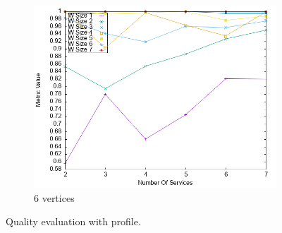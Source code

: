 \begin{figure}[ht]
\begin{subfigure}{0.33\textwidth}
    \includegraphics[width=\textwidth]{Images/graphs/newwindow_quality_performance_diff_perce_n7_s7_20_100_n7}
    \caption{6 vertices}
    \label{fig:quality_window_perce_wide_7n}
  \end{subfigure}
  \caption{ Quality evaluation with \wide profile.}
  \label{fig:quality_window_perce_wide}
\end{figure}


